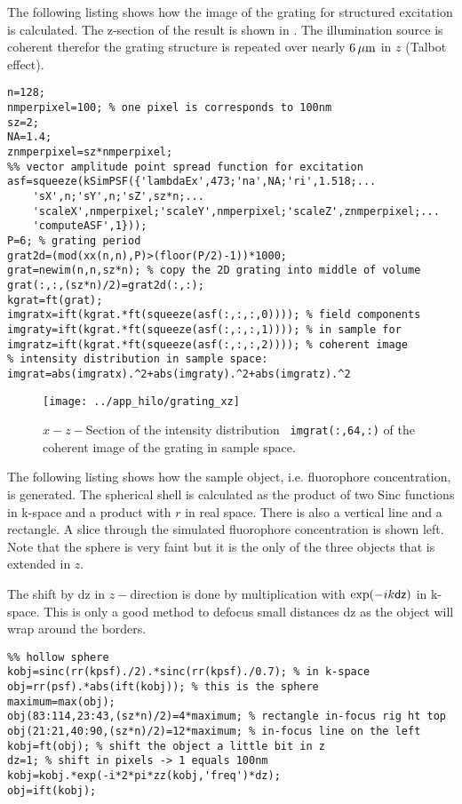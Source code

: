 The following listing shows how the image of the grating for
structured excitation is calculated. The z-section of the result is
shown in . The illumination source is coherent
therefor the grating structure is repeated over nearly $\unit[6]{\mu
  m}$ in $z$ (Talbot effect).
\begin{lstlisting}
n=128;
nmperpixel=100; % one pixel is corresponds to 100nm
sz=2;
NA=1.4;
znmperpixel=sz*nmperpixel;
%% vector amplitude point spread function for excitation
asf=squeeze(kSimPSF({'lambdaEx',473;'na',NA;'ri',1.518;...
    'sX',n;'sY',n;'sZ',sz*n;...
    'scaleX',nmperpixel;'scaleY',nmperpixel;'scaleZ',znmperpixel;...
    'computeASF',1}));
P=6; % grating period
grat2d=(mod(xx(n,n),P)>(floor(P/2)-1))*1000;
grat=newim(n,n,sz*n); % copy the 2D grating into middle of volume
grat(:,:,(sz*n)/2)=grat2d(:,:);
kgrat=ft(grat);
imgratx=ift(kgrat.*ft(squeeze(asf(:,:,:,0)))); % field components
imgraty=ift(kgrat.*ft(squeeze(asf(:,:,:,1)))); % in sample for
imgratz=ift(kgrat.*ft(squeeze(asf(:,:,:,2)))); % coherent image
% intensity distribution in sample space:
imgrat=abs(imgratx).^2+abs(imgraty).^2+abs(imgratz).^2
\end{lstlisting}
\begin{figure}[htb]
  \centering
  \texttt{[image: ../app\_hilo/grating\_xz]}
  \caption{$x-z-$Section of the intensity distribution {\tt
      imgrat(:,64,:)} of the coherent image of the grating in sample
    space.}
  \label{fig:grating}
\end{figure}
The following listing shows how the sample object, i.e. fluorophore
concentration, is generated.  The spherical shell is calculated as the
product of two Sinc functions in k-space and a product with $r$ in
real space. There is also a vertical line and a rectangle. A slice
through the simulated fluorophore concentration is shown
 left. Note that the sphere is very faint but it is
the only of the three objects that is extended in $z$.

The shift by {\sf dz} in $z-$direction is done by multiplication with
$\exp(-ik{\sf dz})$ in k-space. This is only a good method to defocus
small distances {\sf dz} as the object will wrap around the borders.

\begin{lstlisting}
%% hollow sphere
kobj=sinc(rr(kpsf)./2).*sinc(rr(kpsf)./0.7); % in k-space
obj=rr(psf).*abs(ift(kobj)); % this is the sphere
maximum=max(obj);
obj(83:114,23:43,(sz*n)/2)=4*maximum; % rectangle in-focus rig ht top
obj(21:21,40:90,(sz*n)/2)=12*maximum; % in-focus line on the left
kobj=ft(obj); % shift the object a little bit in z
dz=1; % shift in pixels -> 1 equals 100nm
kobj=kobj.*exp(-i*2*pi*zz(kobj,'freq')*dz);
obj=ift(kobj);
\end{lstlisting}

